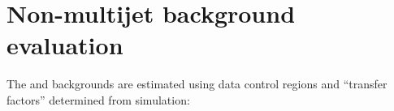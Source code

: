 %
%


\section{Non-multijet background evaluation}
\label{sec:ewk}

The \lost and \znunuj backgrounds are estimated using data control
regions and ``transfer factors'' determined from simulation: 

